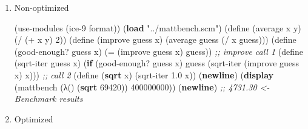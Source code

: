 \documentclass[
]{article}
\newenvironment{Shaded}{}{}
\newcommand{\CommentTok}[1]{\textcolor[rgb]{0.38,0.63,0.69}{\textit{#1}}}
\newcommand{\DecValTok}[1]{\textcolor[rgb]{0.25,0.63,0.44}{#1}}
\newcommand{\ExtensionTok}[1]{#1}
\newcommand{\FloatTok}[1]{\textcolor[rgb]{0.25,0.63,0.44}{#1}}
\newcommand{\FunctionTok}[1]{\textcolor[rgb]{0.02,0.16,0.49}{#1}}
\newcommand{\KeywordTok}[1]{\textcolor[rgb]{0.00,0.44,0.13}{\textbf{#1}}}
\newcommand{\NormalTok}[1]{#1}
\newcommand{\OperatorTok}[1]{\textcolor[rgb]{0.40,0.40,0.40}{#1}}
\newcommand{\StringTok}[1]{\textcolor[rgb]{0.25,0.44,0.63}{#1}}
\begin{document}
\begin{enumerate}
\item
  Non-optimized

\begin{Shaded}
\begin{Highlighting}[numbers=left,,]
\NormalTok{(use{-}modules (ice{-}9 format))}
\NormalTok{(}\KeywordTok{load} \StringTok{"../mattbench.scm"}\NormalTok{)}
\NormalTok{(}\ExtensionTok{define}\FunctionTok{ }\NormalTok{(average x y)}
\NormalTok{  (}\OperatorTok{/}\NormalTok{ (}\OperatorTok{+}\NormalTok{ x y) }\DecValTok{2}\NormalTok{))}
\NormalTok{(}\ExtensionTok{define}\FunctionTok{ }\NormalTok{(improve guess x)}
\NormalTok{  (average guess (}\OperatorTok{/}\NormalTok{ x guess)))}
\NormalTok{(}\ExtensionTok{define}\FunctionTok{ }\NormalTok{(good{-}enough? guess x)}
\NormalTok{   (}\OperatorTok{=}\NormalTok{ (improve guess x) guess)) }\CommentTok{;; improve call 1}
\NormalTok{(}\ExtensionTok{define}\FunctionTok{ }\NormalTok{(sqrt{-}iter guess x)}
\NormalTok{  (}\KeywordTok{if}\NormalTok{ (good{-}enough? guess x)}
\NormalTok{      guess}
\NormalTok{      (sqrt{-}iter (improve guess x) x))) }\CommentTok{;; call 2}
\NormalTok{(}\ExtensionTok{define}\FunctionTok{ }\NormalTok{(}\KeywordTok{sqrt}\NormalTok{ x)}
\NormalTok{  (sqrt{-}iter }\FloatTok{1.0}\NormalTok{ x))}
\NormalTok{(}\KeywordTok{newline}\NormalTok{)}
\NormalTok{(}\KeywordTok{display}\NormalTok{ (mattbench (λ() (}\KeywordTok{sqrt} \DecValTok{69420}\NormalTok{)) }\DecValTok{400000000}\NormalTok{))}
\NormalTok{(}\KeywordTok{newline}\NormalTok{)}
\CommentTok{;; 4731.30 \textless{}{-} Benchmark results}
\end{Highlighting}
\end{Shaded}
\item
  Optimized


\end{enumerate}
\end{document}
